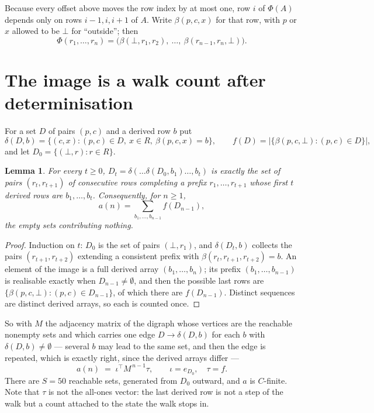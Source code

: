 \documentclass[11pt,a4paper]{article}
\theoremstyle{plain}
\newtheorem{lemma}[theorem]{Lemma}
\theoremstyle{definition}
\begin{document}
Because every offset above moves the row index by at most one, row $i$ of
$\Phi(A)$ depends only on rows $i-1,i,i+1$ of $A$. Write $\beta(p,c,x)$ for that row, with $p$
or $x$ allowed to be $\bot$ for ``outside''; then
\[
\Phi(r_1,\dots,r_n)=\bigl(\beta(\bot,r_1,r_2),\ \dots,\ \beta(r_{n-1},r_n,\bot)\bigr).
\]

\section{The image is a walk count after determinisation}

For a set $D$ of pairs $(p,c)$ and a derived row $b$ put
\[
\delta(D,b)=\{(c,x):(p,c)\in D,\ x\in R,\ \beta(p,c,x)=b\},\qquad
f(D)=\bigl|\{\beta(p,c,\bot):(p,c)\in D\}\bigr| ,
\]
and let $D_0=\{(\bot,r):r\in R\}$.

\begin{lemma}\label{lem:det}
For every $t\ge0$, $D_t=\delta(\dots\delta(D_0,b_1)\dots,b_t)$ is exactly the set of pairs
$(r_t,r_{t+1})$ of consecutive rows completing a prefix $r_1,\dots,r_{t+1}$ whose first $t$
derived rows are $b_1,\dots,b_t$. Consequently, for $n\ge1$,
\[
a(n)=\sum_{b_1,\dots,b_{n-1}}f(D_{n-1}),
\]
the empty sets contributing nothing.
\end{lemma}

\begin{proof}
Induction on $t$: $D_0$ is the set of pairs $(\bot,r_1)$, and $\delta(D_t,b)$ collects the
pairs $(r_{t+1},r_{t+2})$ extending a consistent prefix with
$\beta(r_t,r_{t+1},r_{t+2})=b$. An element of the image is a full derived array
$(b_1,\dots,b_n)$; its prefix $(b_1,\dots,b_{n-1})$ is realisable exactly when
$D_{n-1}\neq\emptyset$, and then the possible last rows are
$\{\beta(p,c,\bot):(p,c)\in D_{n-1}\}$, of which there are $f(D_{n-1})$. Distinct sequences
are distinct derived arrays, so each is counted once.
\end{proof}

So with $M$ the adjacency matrix of the digraph whose vertices are the reachable nonempty sets
and which carries one edge $D\to\delta(D,b)$ for each $b$ with $\delta(D,b)\neq\emptyset$ ---
several $b$ may lead to the same set, and then the edge is repeated, which is exactly right,
since the derived arrays differ ---
\[
a(n)\;=\;\iota^{\!\top}M^{\,n-1}\tau,\qquad \iota=e_{D_0},\quad \tau=f .
\]
There are $S=50$ reachable sets, generated from $D_0$ outward, and $a$ is $C$-finite.
Note that $\tau$ is not the all-ones vector: the last derived row is not a
step of the walk but a count attached to the state the walk stops in.
\end{document}
